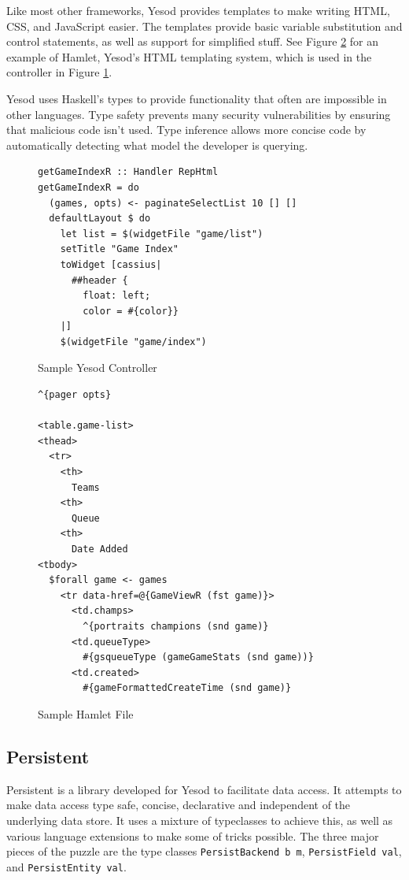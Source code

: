 \documentclass[letterpaper,twocolumn,9pt]{article}
\newcommand{\code}[1]{\texttt{#1}}
\begin{document}
Like most other frameworks, Yesod provides templates to make writing HTML, CSS, and JavaScript easier. The templates provide basic variable substitution and control statements, as well as support for simplified stuff. See Figure \ref{hamlet} for an example of Hamlet, Yesod's HTML templating system, which is used in the controller in Figure \ref{controller}.

Yesod uses Haskell's types to provide functionality that often are impossible in other languages. Type safety prevents many security vulnerabilities by ensuring that malicious code isn't used. Type inference allows more concise code by automatically detecting what model the developer is querying.


\begin{figure}[]
\footnotesize{
\begin{verbatim}
getGameIndexR :: Handler RepHtml
getGameIndexR = do
  (games, opts) <- paginateSelectList 10 [] []
  defaultLayout $ do
    let list = $(widgetFile "game/list")
    setTitle "Game Index"
    toWidget [cassius|
      ##header {
        float: left;
        color = #{color}}
    |]
    $(widgetFile "game/index")
\end{verbatim}
}
    \caption{Sample Yesod Controller}
    \label{controller}
\end{figure}

\begin{figure}[]
\footnotesize{
\begin{verbatim}
^{pager opts}

<table.game-list>
<thead>
  <tr>
    <th>
      Teams
    <th>
      Queue
    <th>
      Date Added
<tbody>
  $forall game <- games
    <tr data-href=@{GameViewR (fst game)}>
      <td.champs>
        ^{portraits champions (snd game)}
      <td.queueType>
        #{gsqueueType (gameGameStats (snd game))}
      <td.created>
        #{gameFormattedCreateTime (snd game)}
\end{verbatim}
}
    \caption{Sample Hamlet File}
    \label{hamlet}
\end{figure}

\subsection{Persistent}

Persistent is a library developed for Yesod to facilitate data access.  It attempts to make data access type safe, concise, declarative and independent of the underlying data store.  It uses a mixture of typeclasses to achieve this, as well as various language extensions to make some of tricks possible.  The three major pieces of the puzzle are the type classes \code{PersistBackend b m}, \code{PersistField val}, and \code{PersistEntity val}.
\end{document}
